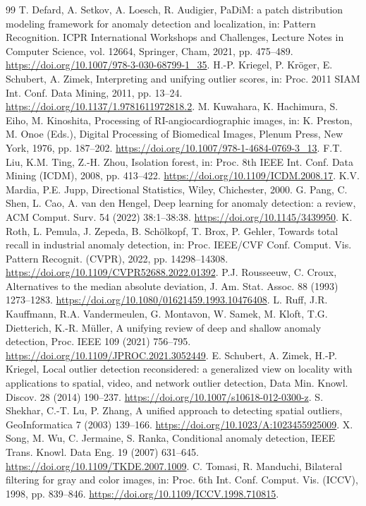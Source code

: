 \documentclass[preprint,review,12pt]{elsarticle}
\begin{document}
\begin{thebibliography}{99}
 T. Defard, A. Setkov, A. Loesch, R. Audigier, PaDiM: a patch distribution modeling framework for anomaly detection and localization, in: Pattern Recognition. ICPR International Workshops and Challenges, Lecture Notes in Computer Science, vol. 12664, Springer, Cham, 2021, pp. 475--489. \url{https://doi.org/10.1007/978-3-030-68799-1_35}.
 H.-P. Kriegel, P. Kr{\"o}ger, E. Schubert, A. Zimek, Interpreting and unifying outlier scores, in: Proc. 2011 SIAM Int. Conf. Data Mining, 2011, pp. 13--24. \url{https://doi.org/10.1137/1.9781611972818.2}.
 M. Kuwahara, K. Hachimura, S. Eiho, M. Kinoshita, Processing of RI-angiocardiographic images, in: K. Preston, M. Onoe (Eds.), Digital Processing of Biomedical Images, Plenum Press, New York, 1976, pp. 187--202. \url{https://doi.org/10.1007/978-1-4684-0769-3_13}.
 F.T. Liu, K.M. Ting, Z.-H. Zhou, Isolation forest, in: Proc. 8th IEEE Int. Conf. Data Mining (ICDM), 2008, pp. 413--422. \url{https://doi.org/10.1109/ICDM.2008.17}.
 K.V. Mardia, P.E. Jupp, Directional Statistics, Wiley, Chichester, 2000.
 G. Pang, C. Shen, L. Cao, A. van den Hengel, Deep learning for anomaly detection: a review, ACM Comput. Surv. 54 (2022) 38:1--38:38. \url{https://doi.org/10.1145/3439950}.
 K. Roth, L. Pemula, J. Zepeda, B. Sch{\"o}lkopf, T. Brox, P. Gehler, Towards total recall in industrial anomaly detection, in: Proc. IEEE/CVF Conf. Comput. Vis. Pattern Recognit. (CVPR), 2022, pp. 14298--14308. \url{https://doi.org/10.1109/CVPR52688.2022.01392}.
 P.J. Rousseeuw, C. Croux, Alternatives to the median absolute deviation, J. Am. Stat. Assoc. 88 (1993) 1273--1283. \url{https://doi.org/10.1080/01621459.1993.10476408}.
 L. Ruff, J.R. Kauffmann, R.A. Vandermeulen, G. Montavon, W. Samek, M. Kloft, T.G. Dietterich, K.-R. M{\"u}ller, A unifying review of deep and shallow anomaly detection, Proc. IEEE 109 (2021) 756--795. \url{https://doi.org/10.1109/JPROC.2021.3052449}.
 E. Schubert, A. Zimek, H.-P. Kriegel, Local outlier detection reconsidered: a generalized view on locality with applications to spatial, video, and network outlier detection, Data Min. Knowl. Discov. 28 (2014) 190--237. \url{https://doi.org/10.1007/s10618-012-0300-z}.
 S. Shekhar, C.-T. Lu, P. Zhang, A unified approach to detecting spatial outliers, GeoInformatica 7 (2003) 139--166. \url{https://doi.org/10.1023/A:1023455925009}.
 X. Song, M. Wu, C. Jermaine, S. Ranka, Conditional anomaly detection, IEEE Trans. Knowl. Data Eng. 19 (2007) 631--645. \url{https://doi.org/10.1109/TKDE.2007.1009}.
 C. Tomasi, R. Manduchi, Bilateral filtering for gray and color images, in: Proc. 6th Int. Conf. Comput. Vis. (ICCV), 1998, pp. 839--846. \url{https://doi.org/10.1109/ICCV.1998.710815}.
\end{thebibliography}
\end{document}
